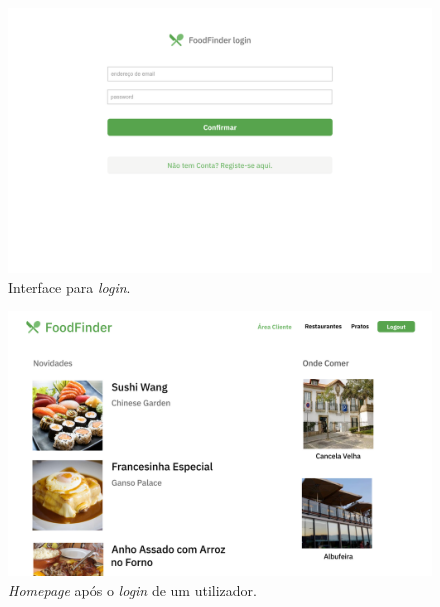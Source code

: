 \documentclass[a4paper,12pt]{report}
\begin{document}
	\begin{figure}[H]
	\begin{center}
	\includegraphics[scale=0.25]{3.1-Screen3}	
	\end{center}
	\caption{Interface para \textit{login}.}
	\end{figure} 
	
	\begin{figure}[H]
	\begin{center}
	\includegraphics[scale=0.25]{7.1-Screen4}	
	\end{center}
	\caption{\textit{Homepage} após o \textit{login} de um utilizador.}
	\end{figure} 
	
\end{document}
